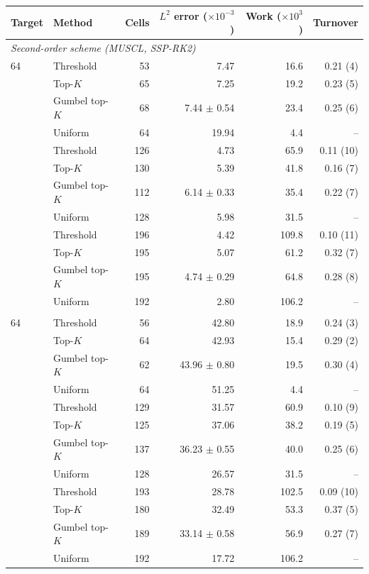\begin{tabular}{llrrrr}
\toprule
Target & Method & Cells & $L^2$ error ($\times10^{-3}$) & Work ($\times10^{3}$) & Turnover \\
\midrule
\multicolumn{6}{l}{\emph{Second-order scheme (MUSCL, SSP-RK2)}} \\
64 & Threshold & 53 & 7.47 & 16.6 & 0.21 (4) \\
 & Top-$K$ & 65 & 7.25 & 19.2 & 0.23 (5) \\
 & Gumbel top-$K$ & 68 & 7.44 $\pm$ 0.54 & 23.4 & 0.25 (6) \\
 & Uniform & 64 & 19.94 & 4.4 & -- \\
\addlinespace
128 & Threshold & 126 & 4.73 & 65.9 & 0.11 (10) \\
 & Top-$K$ & 130 & 5.39 & 41.8 & 0.16 (7) \\
 & Gumbel top-$K$ & 112 & 6.14 $\pm$ 0.33 & 35.4 & 0.22 (7) \\
 & Uniform & 128 & 5.98 & 31.5 & -- \\
\addlinespace
192 & Threshold & 196 & 4.42 & 109.8 & 0.10 (11) \\
 & Top-$K$ & 195 & 5.07 & 61.2 & 0.32 (7) \\
 & Gumbel top-$K$ & 195 & 4.74 $\pm$ 0.29 & 64.8 & 0.28 (8) \\
 & Uniform & 192 & 2.80 & 106.2 & -- \\
\addlinespace
\multicolumn{6}{l}{\emph{First-order scheme (Rusanov, forward Euler)}} \\
64 & Threshold & 56 & 42.80 & 18.9 & 0.24 (3) \\
 & Top-$K$ & 64 & 42.93 & 15.4 & 0.29 (2) \\
 & Gumbel top-$K$ & 62 & 43.96 $\pm$ 0.80 & 19.5 & 0.30 (4) \\
 & Uniform & 64 & 51.25 & 4.4 & -- \\
\addlinespace
128 & Threshold & 129 & 31.57 & 60.9 & 0.10 (9) \\
 & Top-$K$ & 125 & 37.06 & 38.2 & 0.19 (5) \\
 & Gumbel top-$K$ & 137 & 36.23 $\pm$ 0.55 & 40.0 & 0.25 (6) \\
 & Uniform & 128 & 26.57 & 31.5 & -- \\
\addlinespace
192 & Threshold & 193 & 28.78 & 102.5 & 0.09 (10) \\
 & Top-$K$ & 180 & 32.49 & 53.3 & 0.37 (5) \\
 & Gumbel top-$K$ & 189 & 33.14 $\pm$ 0.58 & 56.9 & 0.27 (7) \\
 & Uniform & 192 & 17.72 & 106.2 & -- \\
\bottomrule
\end{tabular}
